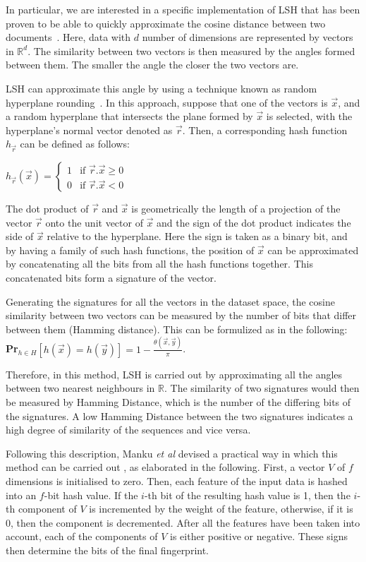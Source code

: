 \documentclass[titlepage]{csetr}
\begin{document}
In particular, we are interested in a specific implementation of LSH that has been proven to be able to quickly approximate the cosine distance between two documents~\cite{Simhash}. Here, data with $d$ number of dimensions are represented by vectors in $\mathbb{R}^{d}$. The similarity between two vectors is then measured by the angles formed between them. The smaller the angle the closer the two vectors are.

LSH can approximate this angle by using a technique known as random hyperplane rounding~\cite{Simhash}. In this approach, suppose that one of the vectors is $\vec{x}$, and a random hyperplane that intersects the plane formed by $\vec{x}$ is selected, with the hyperplane's normal vector denoted as $\vec{r}$. Then, a corresponding hash function ${h}_{\vec{r}}$ can be defined as follows:

$
{h}_{\vec{r}}(\vec{x}) =
\left\{
	\begin{array}{ll}
		1  & \mbox{if } \vec{r}.\vec{x} \geq 0 \\
		0 & \mbox{if } \vec{r}.\vec{x} < 0
	\end{array}
\right.
$

The dot product of $\vec{r}$ and $\vec{x}$ is geometrically the length of a projection of the vector $\vec{r}$ onto the unit vector of $\vec{x}$ and the sign of the dot product indicates the side of $\vec{x}$ relative to the hyperplane. Here the sign is taken as a binary bit, and by having a family of such hash functions, the position of $\vec{x}$ can be approximated by concatenating all the bits from all the hash functions together. This concatenated bits form a signature of the vector.

Generating the signatures for all the vectors in the dataset space, the cosine similarity between two vectors can be measured by the number of bits that differ between them (Hamming distance). This can be formulized as in the following:
\textbf{Pr}$_{h \in H}[h(\vec{x})=h(\vec{y})]=1-\frac{\theta(\vec{x},\vec{y})}{\pi}$.

Therefore, in this method, LSH is carried out by approximating all the angles between two nearest neighbours in $\mathbb{R}$. The similarity of two signatures would then be measured by Hamming Distance, which is the number of the differing bits of the signatures. A low Hamming Distance between the two signatures indicates a high degree of similarity of the sequences and vice versa.

Following this description, Manku \emph{et al} devised a practical way in which this method can be carried out \cite{MankuSimhash}, as elaborated in the following. First, a vector $V$ of $f$ dimensions is initialised to zero. Then, each feature of the input data is hashed into an $f$-bit hash value. If the $i$-th bit of the resulting hash value is 1, then the $i$-th component of $V$ is incremented by the weight of the feature, otherwise, if it is 0, then the component is decremented. After all the features have been taken into account, each of the components of $V$ is either positive or negative. These signs then determine the bits of the final fingerprint.
\end{document}
